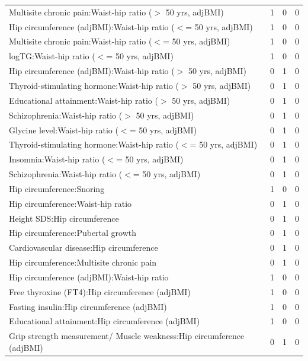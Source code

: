 \begin{table}[ht]
\begin{tabular}{lrrr}
  Multisite chronic pain:Waist-hip ratio ($>$ 50 yrs, adjBMI) &   1 &   0 &   0 \\ 
  Hip circumference (adjBMI):Waist-hip ratio ($<$= 50 yrs, adjBMI) &   1 &   0 &   0 \\ 
  Multisite chronic pain:Waist-hip ratio ($<$= 50 yrs, adjBMI) &   1 &   0 &   0 \\ 
  logTG:Waist-hip ratio ($<$= 50 yrs, adjBMI) &   1 &   0 &   0 \\ 
  Hip circumference (adjBMI):Waist-hip ratio ($>$ 50 yrs, adjBMI) &   0 &   1 &   0 \\ 
  Thyroid-stimulating hormone:Waist-hip ratio ($>$ 50 yrs, adjBMI) &   0 &   1 &   0 \\ 
  Educational attainment:Waist-hip ratio ($>$ 50 yrs, adjBMI) &   0 &   1 &   0 \\ 
  Schizophrenia:Waist-hip ratio ($>$ 50 yrs, adjBMI) &   0 &   1 &   0 \\ 
  Glycine level:Waist-hip ratio ($<$= 50 yrs, adjBMI) &   0 &   1 &   0 \\ 
  Thyroid-stimulating hormone:Waist-hip ratio ($<$= 50 yrs, adjBMI) &   0 &   1 &   0 \\ 
  Insomnia:Waist-hip ratio ($<$= 50 yrs, adjBMI) &   0 &   1 &   0 \\ 
  Schizophrenia:Waist-hip ratio ($<$= 50 yrs, adjBMI) &   0 &   1 &   0 \\ 
  Hip circumference:Snoring &   1 &   0 &   0 \\ 
  Hip circumference:Waist-hip ratio &   0 &   1 &   0 \\ 
  Height SDS:Hip circumference &   0 &   1 &   0 \\ 
  Hip circumference:Pubertal growth &   0 &   1 &   0 \\ 
  Cardiovascular disease:Hip circumference &   0 &   1 &   0 \\ 
  Hip circumference:Multisite chronic pain &   0 &   1 &   0 \\ 
  Hip circumference (adjBMI):Waist-hip ratio &   1 &   0 &   0 \\ 
  Free thyroxine (FT4):Hip circumference (adjBMI) &   1 &   0 &   0 \\ 
  Fasting insulin:Hip circumference (adjBMI) &   1 &   0 &   0 \\ 
  Educational attainment:Hip circumference (adjBMI) &   1 &   0 &   0 \\ 
  Grip strength measurement/ Muscle weakness:Hip circumference (adjBMI) &   0 &   1 &   0 \\ 

\end{tabular}
\end{table}
